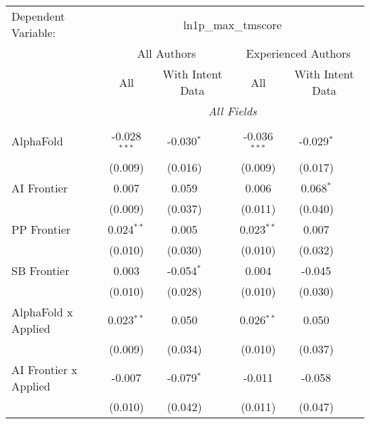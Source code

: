 \begingroup
\centering
\begin{tabular}{lcccccc}
   \tabularnewline \midrule \midrule
   Dependent Variable: & \multicolumn{6}{c}{ln1p\_max\_tmscore}\\
 & \multicolumn{3}{c}{All Authors} & \multicolumn{3}{c}{Experienced Authors} \\
\cmidrule(lr){2-4} \cmidrule(lr){5-7}
 & \multicolumn{1}{c}{All} & \multicolumn{2}{c}{With Intent Data} & \multicolumn{1}{c}{All} & \multicolumn{2}{c}{With Intent Data} \\
\cmidrule(lr){2-2} \cmidrule(lr){3-4} \cmidrule(lr){5-5} \cmidrule(lr){6-7}
 & \multicolumn{6}{c}{\textit{All Fields}} \\ \\
   AlphaFold                      & -0.028$^{***}$ & -0.030$^{*}$ &                & -0.036$^{***}$ & -0.029$^{*}$ &   \\   
                                  & (0.009)        & (0.016)      &                & (0.009)        & (0.017)      &   \\   
   AI Frontier                    & 0.007          & 0.059        &                & 0.006          & 0.068$^{*}$  &   \\   
                                  & (0.009)        & (0.037)      &                & (0.011)        & (0.040)      &   \\   
   PP Frontier                    & 0.024$^{**}$   & 0.005        &                & 0.023$^{**}$   & 0.007        &   \\   
                                  & (0.010)        & (0.030)      &                & (0.010)        & (0.032)      &   \\   
   SB Frontier                    & 0.003          & -0.054$^{*}$ &                & 0.004          & -0.045       &   \\   
                                  & (0.010)        & (0.028)      &                & (0.010)        & (0.030)      &   \\   
   AlphaFold x Applied            & 0.023$^{**}$   & 0.050        &                & 0.026$^{**}$   & 0.050        &   \\   
                                  & (0.009)        & (0.034)      &                & (0.010)        & (0.037)      &   \\   
   AI Frontier x Applied          & -0.007         & -0.079$^{*}$ &                & -0.011         & -0.058       &   \\   
                                  & (0.010)        & (0.042)      &                & (0.011)        & (0.047)      &   \\   

\end{tabular}
